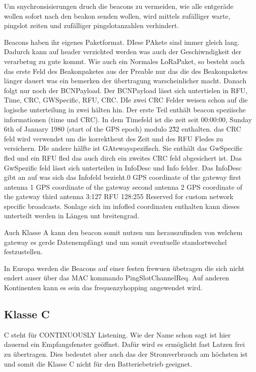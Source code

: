 \documentclass[a4paper,12pt]{article}
\begin{document}
                Um snychronsisierungen druch die beacons zu vermeiden, wie alle entgeräde wollen sofort nach den beakon senden wollen, wird mittels zufälliger warte, pingslot zeiten und zufälliger pingslotanzahlen verhindert.

                Beacons haben ihr eigenes Paketformat. DIese PAkete sind immer gleich lang. Dadurch kann auf header verzichted werden was auch der Geschiwndigkeit der verarbetug zu gute kommt. Wie auch ein Normales LoRaPaket, so besteht auch das erste Feld des Beakonpaketes aus der Preable nur das die des Beakonpaketes länger dauert was ein bemerken der übertragung warscheinlicher macht. Danach folgt nur noch der BCNPayload.
                Der BCNPayload lässt sich untertielen in RFU, Time, CRC, GWSpecific, RFU, CRC. DIe zwei CRC Felder weisen schon auf die logische unterteilung in zwei hälten hin. Der erste Teil enthält beacon speziische informationen (time und CRC). In dem Timefeld ist die zeit seit 00:00:00, Sunday 6th of January 1980 (start of the GPS epoch) modulo 2\^32 enthalten. das CRC feld wird verwendet um die korrektheut des Zeit und des RFU Fledes zu versichern.
                DIe andere hälfte ist GAtewayspezifisch. Sie enthält das GwSpecific fled und ein RFU fled das auch dirch ein zweites CRC feld abgesichert ist. Das GwSpezific feld lässt sich unterteilen in InfoDesc und Info felder. Das InfoDesc gibt an auf was sich das Infofeld bezieht.0
                GPS coordinate of the gateway first antenna
                1
                GPS coordinate of the gateway second antenna
                2
                GPS coordinate of the gateway third antenna
                3:127
                RFU
                128:255
                Reserved for custom network specific broadcasts.
                Sonlage sich im infofled coordinaten enthalten kann dieses unterteilt werden in Längen unt breitengrad.
                
                Auch Klasse A kann den beacon somit nutzen um herauszufinden von welchem gateway es gerde Datenempfängt und um somit eventuelle standortwechel festzustellen.
                
                In Europa werden die Beacons auf einer festen frewuen übetragen die sich nicht endert auser über das MAC kommando PingSlotChannelReq. Auf anderen Kontinenten kann es sein das frequenzyhopping angewendet wird. 
        \subsection{Klasse C}
            C steht für CONTINUOUSLY Listening. Wie der Name schon sagt ist hier dauernd ein Empfangsfenster geöffnet.
            Dafür wird es ermöglicht fast Latzen frei zu übertragen. Dies bedeutet aber auch das der Stromverbrauch am 
            höchsten ist und somit die Klasse C nicht für den Batteriebetrieb geeignet. 
\end{document}
